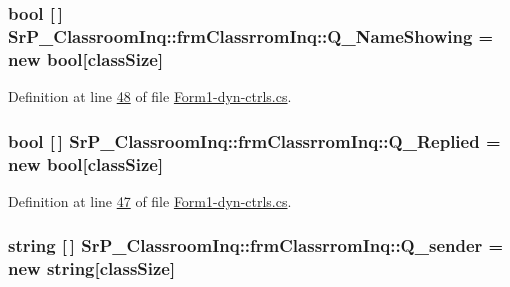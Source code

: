 \hypertarget{class_sr_p___classroom_inq_1_1frm_classrrom_inq_a717931be8f79e53cf69e10515df3115e}{
\subsubsection[{\-Q\-\_\-\-Name\-Showing}]{\setlength{\rightskip}{0pt plus 5cm}bool \mbox{[}$\,$\mbox{]} {\bf \-Sr\-P\-\_\-\-Classroom\-Inq\-::frm\-Classrrom\-Inq\-::\-Q\-\_\-\-Name\-Showing} = new bool\mbox{[}{\bf class\-Size}\mbox{]}}}
\label{class_sr_p___classroom_inq_1_1frm_classrrom_inq_a717931be8f79e53cf69e10515df3115e}


\-Definition at line \hyperlink{_form1-dyn-ctrls_8cs_source_l00048}{48} of file \hyperlink{_form1-dyn-ctrls_8cs_source}{\-Form1-\/dyn-\/ctrls.\-cs}.

\hypertarget{class_sr_p___classroom_inq_1_1frm_classrrom_inq_af7c089d129d15a45c05bede3e9554f58}{
\subsubsection[{\-Q\-\_\-\-Replied}]{\setlength{\rightskip}{0pt plus 5cm}bool \mbox{[}$\,$\mbox{]} {\bf \-Sr\-P\-\_\-\-Classroom\-Inq\-::frm\-Classrrom\-Inq\-::\-Q\-\_\-\-Replied} = new bool\mbox{[}{\bf class\-Size}\mbox{]}}}
\label{class_sr_p___classroom_inq_1_1frm_classrrom_inq_af7c089d129d15a45c05bede3e9554f58}


\-Definition at line \hyperlink{_form1-dyn-ctrls_8cs_source_l00047}{47} of file \hyperlink{_form1-dyn-ctrls_8cs_source}{\-Form1-\/dyn-\/ctrls.\-cs}.

\hypertarget{class_sr_p___classroom_inq_1_1frm_classrrom_inq_afa4b6c4601d48db676d4013daef6624c}{
\subsubsection[{\-Q\-\_\-sender}]{\setlength{\rightskip}{0pt plus 5cm}string \mbox{[}$\,$\mbox{]} {\bf \-Sr\-P\-\_\-\-Classroom\-Inq\-::frm\-Classrrom\-Inq\-::\-Q\-\_\-sender} = new string\mbox{[}{\bf class\-Size}\mbox{]}}}
\label{class_sr_p___classroom_inq_1_1frm_classrrom_inq_afa4b6c4601d48db676d4013daef6624c}


